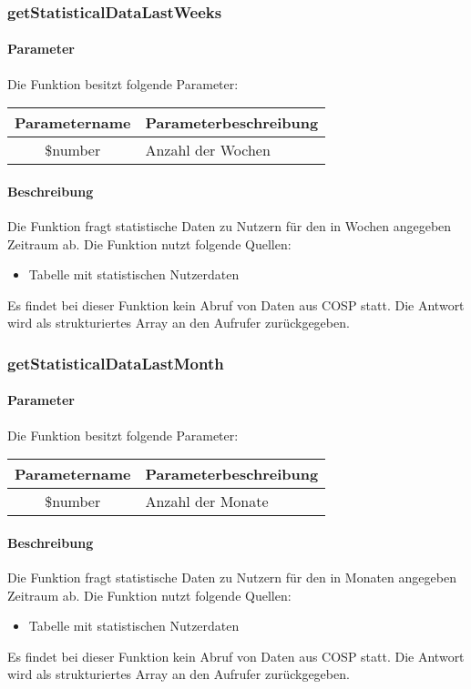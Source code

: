 \subsubsection{getStatisticalDataLastWeeks}
\paragraph{Parameter} Die Funktion besitzt folgende Parameter:
\begin{table}[H]
	\begin{tabular}{|c|p{11cm}|}
		\hline
		\textbf{Parametername} & \textbf{Parameterbeschreibung} \\ \hline
		\$number & Anzahl der Wochen \\ \hline
	\end{tabular}
\end{table}
\paragraph{Beschreibung} Die Funktion fragt statistische Daten zu Nutzern für den in Wochen angegeben Zeitraum ab. Die Funktion nutzt folgende Quellen:
\begin{itemize}
	\item Tabelle mit statistischen Nutzerdaten
\end{itemize}
Es findet bei dieser Funktion kein Abruf von Daten aus {\glqq COSP\grqq} statt. Die Antwort wird als strukturiertes Array an den Aufrufer zurückgegeben.
\subsubsection{getStatisticalDataLastMonth}
\paragraph{Parameter} Die Funktion besitzt folgende Parameter:
\begin{table}[H]
	\begin{tabular}{|c|p{11cm}|}
		\hline
		\textbf{Parametername} & \textbf{Parameterbeschreibung} \\ \hline
		\$number & Anzahl der Monate \\ \hline
	\end{tabular}
\end{table}
\paragraph{Beschreibung} Die Funktion fragt statistische Daten zu Nutzern für den in Monaten angegeben Zeitraum ab. Die Funktion nutzt folgende Quellen:
\begin{itemize}
	\item Tabelle mit statistischen Nutzerdaten
\end{itemize}
Es findet bei dieser Funktion kein Abruf von Daten aus {\glqq COSP\grqq} statt. Die Antwort wird als strukturiertes Array an den Aufrufer zurückgegeben.
